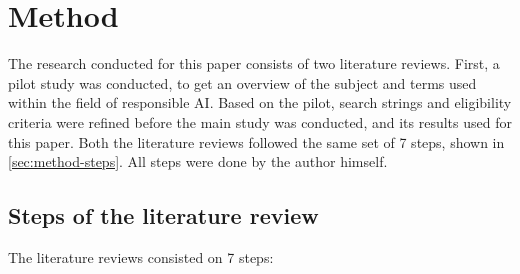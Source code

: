 \section{Method}
\label{sec:Method}




The research conducted for this paper consists of two literature reviews. First, a pilot study was conducted, to get an overview of the subject and terms used within the field of responsible AI. Based on the pilot, search strings and eligibility criteria were refined before the main study was conducted, and its results used for this paper. Both the literature reviews followed the same set of 7 steps, shown in \autoref{sec:method-steps}. All steps were done by the author himself.

\subsection{Steps of the literature review}
\label{sec:method-steps}
The literature reviews consisted on 7 steps:

